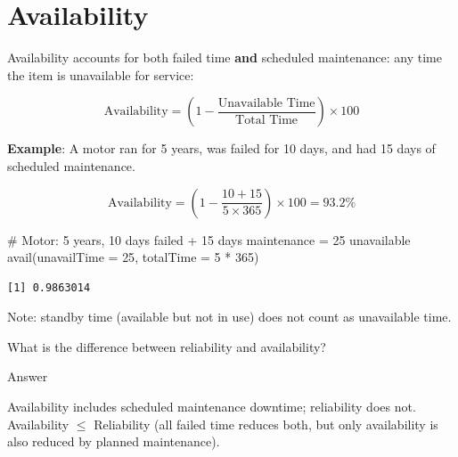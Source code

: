 \documentclass[
  letterpaper,
  DIV=11,
  numbers=noendperiod]{scrreprt}
\newenvironment{Shaded}{\begin{snugshade}}{\end{snugshade}}
\newcommand{\AttributeTok}[1]{\textcolor[rgb]{0.40,0.45,0.13}{#1}}
\newcommand{\CommentTok}[1]{\textcolor[rgb]{0.37,0.37,0.37}{#1}}
\newcommand{\DecValTok}[1]{\textcolor[rgb]{0.68,0.00,0.00}{#1}}
\newcommand{\FunctionTok}[1]{\textcolor[rgb]{0.28,0.35,0.67}{#1}}
\newcommand{\NormalTok}[1]{\textcolor[rgb]{0.00,0.23,0.31}{#1}}
\newcommand{\SpecialCharTok}[1]{\textcolor[rgb]{0.37,0.37,0.37}{#1}}
\begin{document}
\section{Availability}\label{availability}

Availability accounts for both failed time \textbf{and} scheduled
maintenance: any time the item is unavailable for service:

\[\text{Availability} = \left(1 - \frac{\text{Unavailable Time}}{\text{Total Time}}\right) \times 100\]

\textbf{Example}: A motor ran for 5 years, was failed for 10 days, and
had 15 days of scheduled maintenance.

\[\text{Availability} = \left(1 - \frac{10 + 15}{5 \times 365}\right) \times 100 = 93.2\%\]

\begin{Shaded}
\begin{Highlighting}[]
\CommentTok{\# Motor: 5 years, 10 days failed + 15 days maintenance = 25 unavailable}
\FunctionTok{avail}\NormalTok{(}\AttributeTok{unavailTime =} \DecValTok{25}\NormalTok{, }\AttributeTok{totalTime =} \DecValTok{5} \SpecialCharTok{*} \DecValTok{365}\NormalTok{)}
\end{Highlighting}
\end{Shaded}

\begin{verbatim}
[1] 0.9863014
\end{verbatim}

Note: standby time (available but not in use) does not count as
unavailable time.

\begin{tcolorbox}[enhanced jigsaw, arc=.35mm, bottomrule=.15mm, bottomtitle=1mm, breakable, colback=white, colbacktitle=quarto-callout-tip-color!10!white, colframe=quarto-callout-tip-color-frame, coltitle=black, left=2mm, leftrule=.75mm, opacityback=0, opacitybacktitle=0.6, rightrule=.15mm, title=\textcolor{quarto-callout-tip-color}{\faLightbulb}\hspace{0.5em}{Review}, titlerule=0mm, toprule=.15mm, toptitle=1mm]

What is the difference between reliability and availability?

Answer

Availability includes scheduled maintenance downtime; reliability does
not. Availability \(\leq\) Reliability (all failed time reduces both,
but only availability is also reduced by planned maintenance).

\end{tcolorbox}
\end{document}
